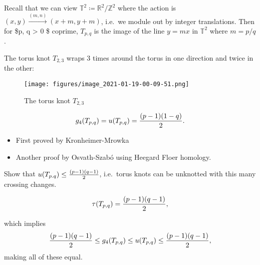 \begin{definition}

Recall that we can view
\({\mathbb{T}}^2 \coloneqq{\mathbb{R}}^2/{\mathbb{Z}}^2\) where the
action is \((x, y) \xrightarrow{(m, n)} (x+m, y+m)\), i.e.~we module out
by integer translations. Then for \$p, q \textgreater{} 0 \$ coprime,
\(T_{p, q}\) is the image of the line \(y = mx\) in \({\mathbb{T}}^2\)
where \(m=p/q\).

\end{definition}

\begin{example}[$T_{2, 3}$ ]

The torus knot \(T_{2, 3}\) wraps 3 times around the torus in one
direction and twice in the other:

\begin{figure}
\centering
\texttt{[image: figures/image\_2021-01-19-00-09-51.png]}
\caption{The torus knot \(T_{2, 3}\)}
\end{figure}

\end{example}

\begin{theorem}[Milnor]

\begin{align*}
g_4(T_{p, q}) = u(T_{p, q}) = { (p-1)(1-q) \over 2}
.\end{align*}

\begin{itemize}
\tightlist
\item
  First proved by Kronheimer-Mrowka
\item
  Another proof by Osvath-Szabó using Heegard Floer homology.
\end{itemize}

\end{theorem}

\begin{exercise}[?]

Show that \(u(T_{p. q}) \leq {(p-1)(q-1) \over 2}\), i.e.~torus knots
can be unknotted with this many crossing changes.

\end{exercise}

\begin{theorem}

\begin{align*}
\tau(T_{p, q}) = 
{(p-1)(q-1) \over 2}
,\end{align*}

which implies
\begin{align*}
{(p-1)(q-1) \over 2}
\leq g_4(T_{p, q})
\leq u(T_{p, q})
\leq {(p-1)(q-1) \over 2}
,\end{align*}
making all of these equal.

\end{theorem}

